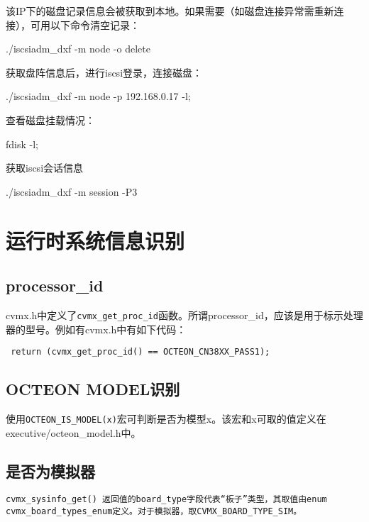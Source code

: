 该IP下的磁盘记录信息会被获取到本地。如果需要（如磁盘连接异常需重新连接），可用以下命令清空记录：
\begin{shellcmd}
./iscsiadm_dxf -m node -o delete
\end{shellcmd}

获取盘阵信息后，进行iscsi登录，连接磁盘：
\begin{shellcmd}
./iscsiadm_dxf -m node  -p 192.168.0.17 -l;
\end{shellcmd}

查看磁盘挂载情况：
\begin{shellcmd}
fdisk -l;
\end{shellcmd}

获取iscsi会话信息
\begin{shellcmd}
./iscsiadm_dxf -m session -P3
\end{shellcmd}




\section{运行时系统信息识别}

\subsection{processor\_id}
cvmx.h中定义了\verb+cvmx_get_proc_id+函数。所谓processor\_id，应该是用于标示处理器的型号。例如有cvmx.h中有如下代码：
\begin{verbatim}
 return (cvmx_get_proc_id() == OCTEON_CN38XX_PASS1);
\end{verbatim}


\subsection{OCTEON MODEL识别}
使用\verb|OCTEON_IS_MODEL(x)|宏可判断是否为模型x。该宏和x可取的值定义在executive/octeon\_model.h中。

\subsection{是否为模拟器}
\begin{verbatim}
cvmx_sysinfo_get() 返回值的board_type字段代表“板子”类型，其取值由enum cvmx_board_types_enum定义。对于模拟器，取CVMX_BOARD_TYPE_SIM。
\end{verbatim}


